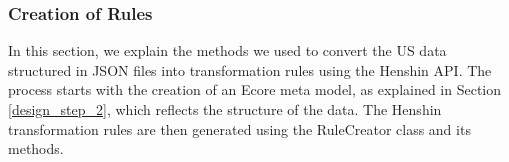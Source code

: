 %	
\subsubsection*{Creation of Rules}\label{step_creation_of_ruels}
In this section, we explain the methods we used to convert the US data structured in JSON files into transformation rules using the Henshin API. The process starts with the creation of an Ecore meta model, as explained in Section \ref{design_step_2}, which reflects the structure of the data. The Henshin transformation rules are then generated using the RuleCreator class and its methods.

